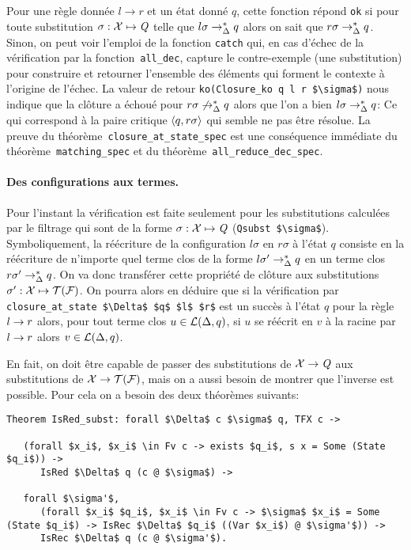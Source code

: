 Pour une règle donnée $l \rightarrow r$ et un état donné $q$, cette fonction répond
\lstinline!ok! si pour toute substitution $\sigma: \mathcal X \mapsto \mathit Q$ telle que $l
\sigma \rightarrow^*_\Delta q$ alors on sait que $r\sigma \rightarrow^*_{\Delta} q$. Sinon, on peut 
voir l'emploi de la fonction \lstinline!catch! qui, en cas d'échec de la vérification
par la fonction~\lstinline!all_dec!, capture le contre-exemple (une substitution)
pour construire et retourner l'ensemble des éléments qui forment le contexte
à l'origine de l'échec. La valeur de retour \lstinline!ko(Closure_ko q l r $\sigma$)!
nous indique que la clôture a échoué pour $r\sigma \not\rightarrow^*_\Delta q$ alors que l'on a bien $l\sigma \rightarrow^*_{\Delta} q$:
Ce qui correspond à la paire critique $\langle q, r\sigma\rangle$ qui semble ne pas être résolue. La preuve du théorème~\lstinline!closure_at_state_spec!
est une conséquence immédiate du théorème~\lstinline!matching_spec! et du théorème~\lstinline!all_reduce_dec_spec!.
  

\paragraph{Des configurations aux termes.}

Pour l'instant la vérification est faite seulement pour les substitutions
calculées par le filtrage qui sont de la forme $\sigma:\mathcal X \mapsto \mathit Q$ (\lstinline!Qsubst $\sigma$!).
Symboliquement, la réécriture de la configuration $l\sigma$ en $r\sigma$ à l'état $q$ consiste en la réécriture
de n'importe quel terme clos de la forme $l\sigma' \rightarrow_\Delta^* q$ en un terme clos $r\sigma' \rightarrow_\Delta^* q$.
On va donc transférer cette propriété de clôture aux substitutions $\sigma':\mathcal X \mapsto \mathcal{T(F)}$. On pourra alors en déduire
que si la vérification par \lstinline!closure_at_state $\Delta$ $q$ $l$ $r$! est un succès à l'état $q$ pour la règle
$l \rightarrow r$ alors, pour tout terme clos $u \in \mathcal{L}(\Delta, q)$, si $u$ se réécrit en $v$ à la racine par $l\rightarrow r$  alors $v \in \mathcal{L}(\Delta, q)$.

En fait, on doit être capable de passer des substitutions de $\mathcal X \rightarrow \mathit Q$ aux substitutions de $\mathcal X \to \mathcal{T(F)}$, mais on a aussi
besoin de montrer que l'inverse est possible. Pour cela on a besoin des deux théorèmes suivants:


\begin{lstlisting}
Theorem IsRed_subst: forall $\Delta$ c $\sigma$ q, TFX c -> 

   (forall $x_i$, $x_i$ \in Fv c -> exists $q_i$, s x = Some (State $q_i$)) -> 
      IsRed $\Delta$ q (c @ $\sigma$) ->
  
   forall $\sigma'$, 
      (forall $x_i$ $q_i$, $x_i$ \in Fv c -> $\sigma$ $x_i$ = Some (State $q_i$) -> IsRec $\Delta$ $q_i$ ((Var $x_i$) @ $\sigma'$)) ->
      IsRec $\Delta$ q (c @ $\sigma'$).
\end{lstlisting}


